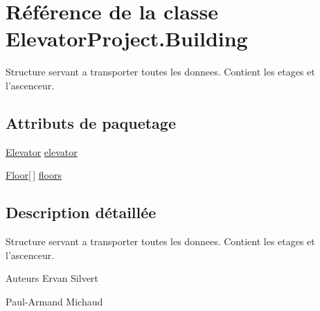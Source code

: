 \hypertarget{classElevatorProject_1_1Building}{\section{Référence de la classe Elevator\-Project.\-Building}
\label{classElevatorProject_1_1Building}
}


Structure servant a transporter toutes les donnees. Contient les etages et l'ascenceur.  


\subsection*{Attributs de paquetage}
\begin{DoxyCompactItemize}
\item 
\hyperlink{classElevatorProject_1_1Elevator}{Elevator} \hyperlink{classElevatorProject_1_1Building_a52a3e7eadfea5feeee5dd2193d6ea504}{elevator}
\item 
\hyperlink{classElevatorProject_1_1Floor}{Floor}\mbox{[}$\,$\mbox{]} \hyperlink{classElevatorProject_1_1Building_affa665538026d6acfa76b886e341169d}{floors}
\end{DoxyCompactItemize}


\subsection{Description détaillée}
Structure servant a transporter toutes les donnees. Contient les etages et l'ascenceur. 

\begin{DoxyAuthor}{Auteurs}
Ervan Silvert 

Paul-\/\-Armand Michaud 
\end{DoxyAuthor}


